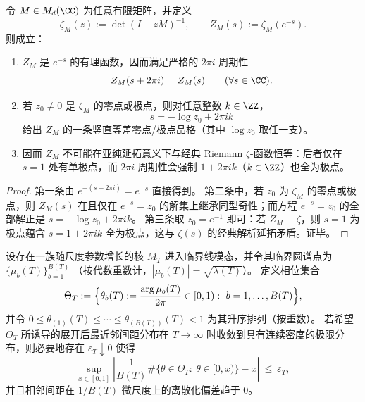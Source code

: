\begin{theorem}\label{thm:operator-finite-state-zeta-2pii-periodic-separation}
令 \(M\in M_d(\CC)\) 为任意有限矩阵，并定义
\[
\zeta_M(z):=\det(I-zM)^{-1},
\qquad
Z_M(s):=\zeta_M(e^{-s}).
\]
则成立：
\begin{enumerate}
  \item \(Z_M\) 是 \(e^{-s}\) 的有理函数，因而满足严格的 \(2\pi i\)-周期性
  \[
  Z_M(s+2\pi i)=Z_M(s)\qquad(\forall s\in\CC).
  \]
  \item 若 \(z_0\neq 0\) 是 \(\zeta_M\) 的零点或极点，则对任意整数 \(k\in\ZZ\)，
  \[
  s=-\log z_0+2\pi i k
  \]
  给出 \(Z_M\) 的一条竖直等差零点/极点晶格（其中 \(\log z_0\) 取任一支）。
  \item 因而 \(Z_M\) 不可能在亚纯延拓意义下与经典 Riemann \(\zeta\)-函数恒等：后者仅在 \(s=1\) 处有单极点，而 \(2\pi i\)-周期性会强制 \(1+2\pi i k\)（\(k\in\ZZ\)）也全为极点。
\end{enumerate}
\end{theorem}
\begin{proof}
第一条由 \(e^{-(s+2\pi i)}=e^{-s}\) 直接得到。
第二条中，若 \(z_0\) 为 \(\zeta_M\) 的零点或极点，则 \(Z_M(s)\) 在且仅在 \(e^{-s}=z_0\) 的解集上继承同型奇性；而方程 \(e^{-s}=z_0\) 的全部解正是 \(s=-\log z_0+2\pi i k\)。
第三条取 \(z_0=e^{-1}\) 即可：若 \(Z_M\equiv \zeta\)，则 \(s=1\) 为极点蕴含 \(s=1+2\pi i k\) 全为极点，这与 \(\zeta(s)\) 的经典解析延拓矛盾。证毕。
\end{proof}

\begin{conjecture}\label{conj:operator-phase-comb-uniformization-necessary}
设存在一族随尺度参数增长的核 \(M_T\) 进入临界线模态，并令其临界圆谱点为
\(
\{\mu_b(T)\}_{b=1}^{B(T)}
\)
（按代数重数计，\(|\mu_b(T)|=\sqrt{\lambda(T)}\)）。
定义相位集合
\[
\Theta_T:=\Bigl\{\theta_b(T):=\frac{\arg\mu_b(T)}{2\pi}\in[0,1):\ b=1,\dots,B(T)\Bigr\},
\]
并令 \(0\le \theta_{(1)}(T)\le\cdots\le \theta_{(B(T))}(T)<1\) 为其升序排列（按重数）。
若希望 \(\Theta_T\) 所诱导的展开后最近邻间距分布在 \(T\to\infty\) 时收敛到具有连续密度的极限分布，则必要地存在 \(\varepsilon_T\downarrow 0\) 使得
\[
\sup_{x\in[0,1]}\left|
\frac{1}{B(T)}\#\{\theta\in\Theta_T:\ \theta\in[0,x)\}-x
\right|\ \le\ \varepsilon_T,
\]
并且相邻间距在 \(1/B(T)\) 微尺度上的离散化偏差趋于 \(0\)。
\end{conjecture}

\endinput
